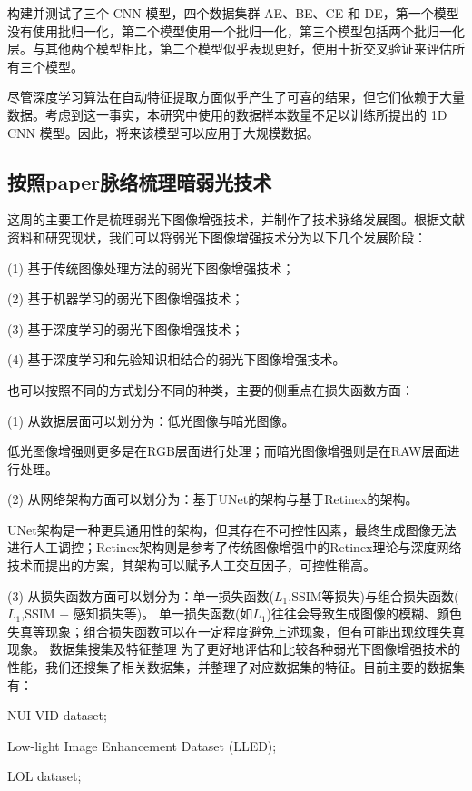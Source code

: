 \documentclass[letterpaper,12pt]{article}
\begin{document}
				构建并测试了三个 CNN 模型，四个数据集群 AE、BE、CE 和 DE，第一个模型没有使用批归一化，第二个模型使用一个批归一化，第三个模型包括两个批归一化层。与其他两个模型相比，第二个模型似乎表现更好，使用十折交叉验证来评估所有三个模型。
				
				尽管深度学习算法在自动特征提取方面似乎产生了可喜的结果，但它们依赖于大量数据。考虑到这一事实，本研究中使用的数据样本数量不足以训练所提出的 1D CNN 模型。因此，将来该模型可以应用于大规模数据。
				
		\subsection{按照paper脉络梳理暗弱光技术}
			
		这周的主要工作是梳理弱光下图像增强技术，并制作了技术脉络发展图。根据文献资料和研究现状，我们可以将弱光下图像增强技术分为以下几个发展阶段：
		
		(1) 基于传统图像处理方法的弱光下图像增强技术；
		
		(2) 基于机器学习的弱光下图像增强技术；
		
		(3) 基于深度学习的弱光下图像增强技术；
		
		(4) 基于深度学习和先验知识相结合的弱光下图像增强技术。
		
		也可以按照不同的方式划分不同的种类，主要的侧重点在损失函数方面：
		
		(1) 从数据层面可以划分为：低光图像与暗光图像。
		
		低光图像增强则更多是在RGB层面进行处理；而暗光图像增强则是在RAW层面进行处理。
		
		(2) 从网络架构方面可以划分为：基于UNet的架构与基于Retinex的架构。
		
		UNet架构是一种更具通用性的架构，但其存在不可控性因素，最终生成图像无法进行人工调控；Retinex架构则是参考了传统图像增强中的Retinex理论与深度网络技术而提出的方案，其架构可以赋予人工交互因子，可控性稍高。
		
		(3) 从损失函数方面可以划分为：单一损失函数($L_1$,SSIM等损失)与组合损失函数($L_1$,SSIM + 感知损失等)。
		单一损失函数(如$L_1$)往往会导致生成图像的模糊、颜色失真等现象；组合损失函数可以在一定程度避免上述现象，但有可能出现纹理失真现象。
		数据集搜集及特征整理
		为了更好地评估和比较各种弱光下图像增强技术的性能，我们还搜集了相关数据集，并整理了对应数据集的特征。目前主要的数据集有：
		
		NUI-VID dataset;
		
		Low-light Image Enhancement Dataset (LLED);
		
		LOL dataset;
		
\end{document}
